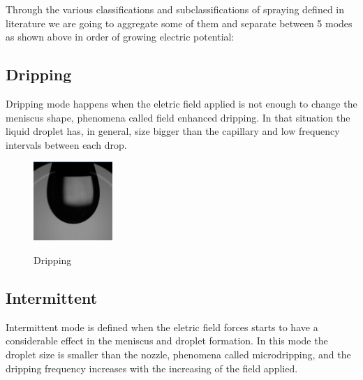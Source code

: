 Through the various classifications and subclassifications of spraying defined in literature we are going to aggregate some of them and separate between 5 modes as shown above in order of growing electric potential:

\subsection{Dripping}
\label{subsec:dripping}

Dripping mode happens when the eletric field applied is not enough to change the meniscus shape, phenomena called field enhanced dripping.
In that situation the liquid droplet has, in general, size bigger than the capillary and low frequency intervals between each drop.

\begin{figure}[H]
  \center
  \includegraphics[width=3cm]{Figuras/19:03/drip_example.png}
  \label{fig:drip_example}
  \caption{Dripping}
\end{figure}

\subsection{Intermittent}
\label{subsec:Intermittent}

Intermittent mode is defined when the eletric field forces starts to have a considerable effect in the meniscus and droplet formation. 
In this mode the droplet size is smaller than the nozzle, phenomena called microdripping, and the dripping frequency increases with the increasing of the field applied.

